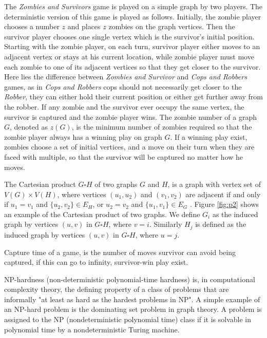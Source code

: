 \documentclass[1p]{elsarticle}
\begin{document}
The {\it Zombies and Survivors} game is played on a simple graph by two players. The deterministic version of this game
\cite{Fitz16} is played as follows. Initially, the zombie player chooses a number $z$ and places $z$ zombies on the
graph vertices. Then the survivor player chooses one single vertex which is the survivor's initial position. Starting
with the zombie player, on each turn, survivor player either moves to an adjacent vertex or stays at his current
location, while zombie player must move each zombie to one of its adjacent vertices so that they get closer to the
survivor. Here lies the difference between {\it Zombies and Survivor} and {\it Cops and Robbers} games, as in {\it Cops
and Robbers} cops should not necessarily get closer to the {\it Robber}, they can either hold their current position or
either get further away from the robber.  If any zombie and the survivor ever occupy the same vertex, the survivor is
captured and the zombie player wins. The zombie number of a graph $G$, denoted as $z(G)$, is the minimum number of
zombies required so that the zombie player always has a winning play on graph $G$. If a winning play exist, zombies
choose a set of initial vertices, and a move on their turn when they are faced with multiple, so that the survivor will
be captured no matter how he moves.

The Cartesian product $G \square H$ of two graphs $G$ and $H$, is a graph with vertex set of $V(G) \times V(H)$, where
vertices $(u_1 , u_2)$ and $(v_1 , v_2)$ are adjacent if and only if $u_1 = v_1$ and $ \{ u_2 , v_2 \} \in E_{H} $, or
$u_2 = v_2$ and $ \{u_1 , v_1 \} \in E_{G}$ \cite{West02}. Figure \ref{fig:p2} shows an example of the Cartesian product
of two graphs. We define $G_{i}$ as the induced graph by vertices $(u,v)$ in $G \square H$, where $v=i$. Similarly
$H_{j}$ is defined as the induced graph by vertices $(u,v)$ in $G \square H$, where $u=j$.

Capture time of a game, is the number of moves survivor can avoid being captured, if this can go to infinity, survivor-win play exist.

NP-hardness (non-deterministic polynomial-time hardness) is, in computational complexity theory, the defining property
of a class of problems that are informally "at least as hard as the hardest problems in NP". A simple example of an
NP-hard problem is the dominating set problem in graph theory. A problem is assigned to the NP (nondeterministic polynomial time) class if
it is solvable in polynomial time by a nondeterministic Turing machine.
\end{document}
